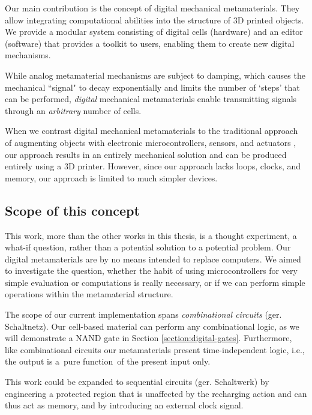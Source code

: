Our main contribution is the concept of digital mechanical metamaterials. They allow integrating computational abilities into the structure of 3D printed objects. We provide a modular system consisting of digital cells (hardware) and an editor (software) that provides a toolkit to users, enabling them to create new digital mechanisms. 

While analog metamaterial mechanisms are subject to damping, which causes the mechanical ``signal" to decay exponentially and limits the number of `steps' that can be performed, \textit{digital} mechanical metamaterials enable transmitting signals through an \textit{arbitrary} number of cells. 

When we contrast digital mechanical metamaterials to the traditional approach of augmenting objects with electronic microcontrollers, sensors, and actuators \cite{Savage2014}, our approach results in an entirely mechanical solution and can be produced entirely using a 3D printer. However, since our approach lacks loops, clocks, and memory, our approach is limited to much simpler devices.


\subsection {Scope of this concept}

This work, more than the other works in this thesis, is a thought experiment, a what-if question, rather than a potential solution to a potential problem. Our digital metamaterials are by no means intended to replace computers. We aimed to investigate the question, whether the habit of using microcontrollers for very simple evaluation or computations is really necessary, or if we can perform simple operations within the metamaterial structure.  

The scope of our current implementation spans \textit{combinational circuits} (ger. Schaltnetz). Our cell-based material can perform any combinational logic, as we will demonstrate a NAND gate in Section \ref{section:digital-gates}. Furthermore, like combinational circuits our metamaterials present time-independent logic, i.e., the output is a pure function of the present input only.

This work could be expanded to sequential circuits (ger. Schaltwerk) by engineering a protected region that is unaffected by the recharging action and can thus act as memory, and by introducing an external clock signal. 




